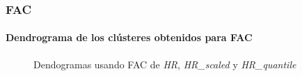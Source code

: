 \subsubsection{FAC}

\paragraph{Dendrograma de los clústeres obtenidos para FAC}

\begin{figure}[H]
    \centering
    
    \caption{Dendogramas usando FAC de \textit{HR}, \textit{HR\_scaled} y \textit{HR\_quantile}}
    \label{fig:acf_den_fc}
\end{figure}

